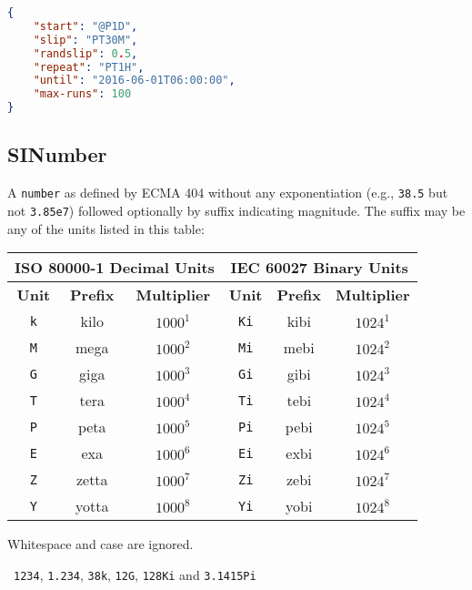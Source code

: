 \documentclass[10pt]{article}
\begin{document}
\example
\begin{lstlisting}[language=json]
{
    "start": "@P1D",
    "slip": "PT30M",
    "randslip": 0.5,
    "repeat": "PT1H",
    "until": "2016-06-01T06:00:00",
    "max-runs": 100
}
\end{lstlisting}



\subsection{SINumber}
A {\tt number} as defined by ECMA 404 without any exponentiation
(e.g., {\tt 38.5} but not {\tt 3.85e7}) followed optionally by suffix
indicating magnitude.  The suffix may be any of the units listed in
this table:

\begin{center}
  \begin{tabular}{|c|c|c|c|c|c|}
    \hline
    \multicolumn{3}{|c}{{\bf ISO 80000-1 Decimal Units}} & \multicolumn{3}{|c|}{{\bf IEC 60027 Binary Units}} \\
    \hline
    {\bf Unit} & {\bf Prefix} & {\bf Multiplier} & {\bf Unit} & {\bf Prefix} & {\bf Multiplier} \\
    \hline
    {\tt k} & kilo & $1000^{1}$ & {\tt Ki} & kibi & $1024^{1}$ \\
    {\tt M} & mega & $1000^{2}$ & {\tt Mi} & mebi & $1024^{2}$ \\
    {\tt G} & giga & $1000^{3}$ & {\tt Gi} & gibi & $1024^{3}$ \\
    {\tt T} & tera & $1000^{4}$ & {\tt Ti} & tebi & $1024^{4}$ \\
    {\tt P} & peta & $1000^{5}$ & {\tt Pi} & pebi & $1024^{5}$ \\
    {\tt E} & exa & $1000^{6}$ & {\tt Ei} & exbi & $1024^{6}$ \\
    {\tt Z} & zetta & $1000^{7}$ & {\tt Zi} & zebi & $1024^{7}$ \\
    {\tt Y} & yotta & $1000^{8}$ & {\tt Yi} & yobi & $1024^{8}$ \\
    \hline
  \end{tabular}
\end{center}

Whitespace and case are ignored.

\example\ {\tt 1234},  {\tt 1.234}, {\tt 38k}, {\tt 12G}, {\tt 128Ki} and {\tt 3.1415Pi}

\\
\\
\end{document}

